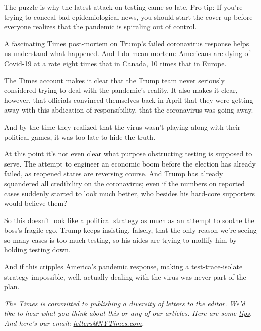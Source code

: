 The puzzle is why the latest attack on testing came so late. Pro tip: If
you're trying to conceal bad epidemiological news, you should start the
cover-up before everyone realizes that the pandemic is spiraling out of
control.

A fascinating Times
\href{https://www.nytimes3xbfgragh.onion/2020/07/18/us/politics/trump-coronavirus-response-failure-leadership.html?action=click\&module=Well\&pgtype=Homepage\&section=Politics}{post-mortem}
on Trump's failed coronavirus response helps us understand what
happened. And I do mean mortem: Americans are
\href{https://www.washingtonpost.com/health/2020/07/19/coronavirus-us-failure/}{dying
of Covid-19} at a rate eight times that in Canada, 10 times that in
Europe.

The Times account makes it clear that the Trump team never seriously
considered trying to deal with the pandemic's reality. It also makes it
clear, however, that officials convinced themselves back in April that
they were getting away with this abdication of responsibility, that the
coronavirus was going away.

And by the time they realized that the virus wasn't playing along with
their political games, it was too late to hide the truth.

At this point it's not even clear what purpose obstructing testing is
supposed to serve. The attempt to engineer an economic boom before the
election has already failed, as reopened states are
\href{https://twitter.com/econjared/status/1285206998439600130}{reversing
course}. And Trump has already
\href{https://www.washingtonpost.com/politics/trump-faces-rising-disapproval-and-widespread-distrust-on-coronavirus-post-abc-poll-finds/2020/07/16/04aa9db2-c79d-11ea-a99f-3bbdffb1af38_story.html}{squandered}
all credibility on the coronavirus; even if the numbers on reported
cases suddenly started to look much better, who besides his hard-core
supporters would believe them?

So this doesn't look like a political strategy as much as an attempt to
soothe the boss's fragile ego. Trump keeps insisting, falsely, that the
only reason we're seeing so many cases is too much testing, so his aides
are trying to mollify him by holding testing down.

And if this cripples America's pandemic response, making a
test-trace-isolate strategy impossible, well, actually dealing with the
virus was never part of the plan.

\emph{The Times is committed to publishing}
\href{https://www.nytimes3xbfgragh.onion/2019/01/31/opinion/letters/letters-to-editor-new-york-times-women.html}{\emph{a
diversity of letters}} \emph{to the editor. We'd like to hear what you
think about this or any of our articles. Here are some}
\href{https://help.nytimes3xbfgragh.onion/hc/en-us/articles/115014925288-How-to-submit-a-letter-to-the-editor}{\emph{tips}}\emph{.
And here's our email:}
\href{mailto:letters@NYTimes.com}{\emph{letters@NYTimes.com}}\emph{.}

